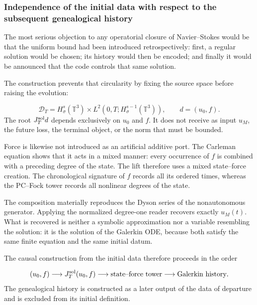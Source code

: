 \subsubsection{Independence of the initial data with respect to the subsequent genealogical history}
The most serious objection to any operatorial closure of Navier–Stokes would be that the uniform bound had been introduced retrospectively: first, a regular solution would be chosen; its history would then be encoded; and finally it would be announced that the code controls that same solution.\par
The construction prevents that circularity by fixing the source space before raising the evolution:\par
\[
\mathcal D_T
=
H^s_\sigma(\mathbb T^3)
\times
L^2(0,T;H^{s-1}_\sigma(\mathbb T^3)),
\qquad
d=(u_0,f).
\]
The root \(J_T^{\rm sol}d\) depends exclusively on \(u_0\) and \(f\). It does not receive as input \(u_M\), the future loss, the terminal object, or the norm that must be bounded.\par
Force is likewise not introduced as an artificial additive port. The Carleman equation shows that it acts in a mixed manner: every occurrence of \(f\) is combined with a preceding degree of the state. The lift therefore uses a mixed state–force creation. The chronological signature of \(f\) records all its ordered times, whereas the PC–Fock tower records all nonlinear degrees of the state.\par
The composition materially reproduces the Dyson series of the nonautonomous generator. Applying the normalized degree-one reader recovers exactly \(u_M(t)\). What is recovered is neither a symbolic approximation nor a variable resembling the solution: it is the solution of the Galerkin ODE, because both satisfy the same finite equation and the same initial datum.\par
The causal construction from the initial data therefore proceeds in the order\par
\[
(u_0,f)
\longrightarrow
J_T^{\rm sol}(u_0,f)
\longrightarrow
\text{state–force tower}
\longrightarrow
\text{Galerkin history}.
\]
The genealogical history is constructed as a later output of the data of departure and is excluded from its initial definition.\par
{}
